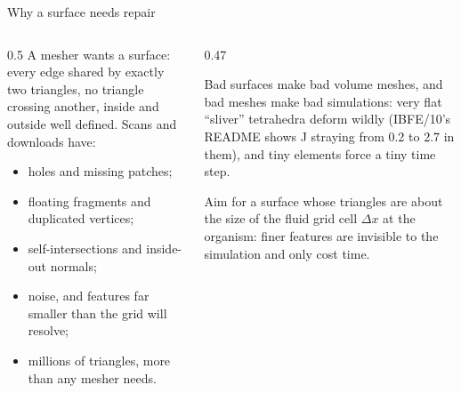 \documentclass[aspectratio=169,11pt]{beamer}
\begin{document}
\begin{frame}{Why a surface needs repair}
\begin{columns}[T,onlytextwidth]
\begin{column}{0.5\textwidth}
A mesher wants a  surface: every edge shared by exactly two triangles, no triangle crossing another, inside and outside well defined. Scans and downloads have:
\begin{itemize}
  \item holes and missing patches;
  \item floating fragments and duplicated vertices;
  \item self-intersections and inside-out normals;
  \item noise, and features far smaller than the grid will resolve;
  \item millions of triangles, more than any mesher needs.
\end{itemize}
\end{column}
\begin{column}{0.47\textwidth}
\begin{punchbox}
\small Bad surfaces make bad volume meshes, and bad meshes make bad simulations: very flat ``sliver'' tetrahedra deform wildly (IBFE/10's README shows J straying from 0.2 to 2.7 in them), and tiny elements force a tiny time step.
\end{punchbox}
\vspace{2mm}
\small Aim for a surface whose triangles are about the size of the fluid grid cell $\Delta x$ at the organism: finer features are invisible to the simulation and only cost time.
\end{column}
\end{columns}
\end{frame}
\end{document}
